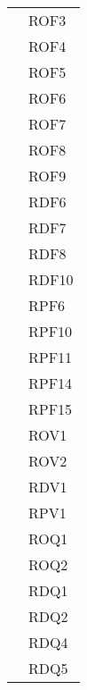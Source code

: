 \begin{longtable}{| p{5cm} | p{5cm} |}
		\rowcolor{LightGray}
		\multirow[t]{23}{*}{\cellcolor{LightGray}}{Capitolato} 
				 & ROF3 \\
				\rowcolor{LightGray} &	ROF4 \\
				\rowcolor{LightGray} &	ROF5 \\
				\rowcolor{LightGray} &	ROF6 \\
				\rowcolor{LightGray} &	ROF7 \\
				\rowcolor{LightGray} &	ROF8 \\
				\rowcolor{LightGray} &	ROF9 \\
				\rowcolor{LightGray} &	RDF6 \\
				\rowcolor{LightGray} &	RDF7 \\
				\rowcolor{LightGray} &	RDF8 \\
				\rowcolor{LightGray} &	RDF10 \\
				\rowcolor{LightGray} &	RPF6 \\
				\rowcolor{LightGray} &	RPF10 \\
				\rowcolor{LightGray} &	RPF11 \\
				\rowcolor{LightGray} &	RPF14 \\
				\rowcolor{LightGray} &	RPF15 \\
				\rowcolor{LightGray} &	ROV1 \\
				\rowcolor{LightGray} &	ROV2 \\
				\rowcolor{LightGray} &	RDV1 \\
				\rowcolor{LightGray} &	RPV1 \\
				\rowcolor{LightGray} &	ROQ1 \\
				\rowcolor{LightGray} &	ROQ2\\
				\rowcolor{LightGray} &	RDQ1\\
				\rowcolor{LightGray} &	RDQ2 \\
				\rowcolor{LightGray} &	RDQ4 \\
				\rowcolor{LightGray} &	RDQ5 \\
		

\end{longtable}
